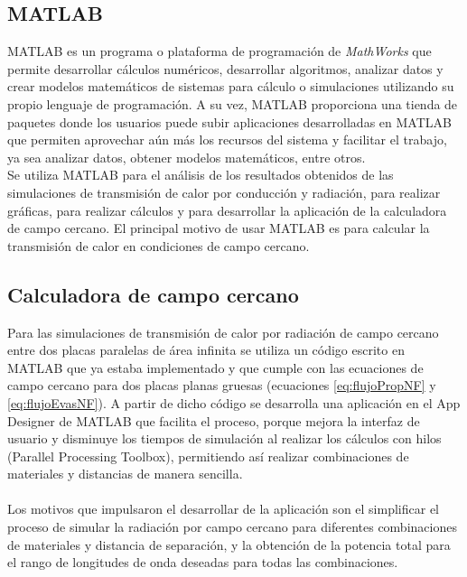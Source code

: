 \subsection{MATLAB}
MATLAB es un programa o plataforma de programación de \textit{MathWorks} que permite desarrollar cálculos numéricos, desarrollar algoritmos, analizar datos y crear modelos matemáticos de sistemas para cálculo o simulaciones utilizando su propio lenguaje de programación. A su vez, MATLAB proporciona una tienda de paquetes donde los usuarios puede subir aplicaciones desarrolladas en MATLAB que permiten aprovechar aún más los recursos del sistema y facilitar el trabajo, ya sea analizar datos, obtener modelos matemáticos, entre otros.\\
Se utiliza MATLAB para el análisis de los resultados obtenidos de las simulaciones de transmisión de calor por conducción y radiación, para realizar gráficas, para realizar cálculos y para desarrollar la aplicación de la calculadora de campo cercano. El principal motivo de usar MATLAB es para calcular la transmisión de calor en condiciones de campo cercano.

\subsection{Calculadora de campo cercano} \label{sec:calc_campo_cercano}
Para las simulaciones de transmisión de calor por radiación de campo cercano entre dos placas paralelas de área infinita se utiliza un código escrito en MATLAB que ya estaba implementado y que cumple con las ecuaciones de campo cercano para dos placas planas gruesas (ecuaciones \eqref{eq:flujoPropNF} y \eqref{eq:flujoEvasNF}). A partir de dicho código se desarrolla una aplicación en el App Designer de MATLAB que facilita el proceso, porque mejora la interfaz de usuario y disminuye los tiempos de simulación al realizar los cálculos con hilos (Parallel Processing Toolbox), permitiendo así realizar combinaciones de materiales y distancias de manera sencilla.\\\\
Los motivos que impulsaron el desarrollar de la aplicación son el simplificar el proceso de simular la radiación por campo cercano para diferentes combinaciones de materiales y distancia de separación, y la obtención de la potencia total para el rango de longitudes de onda deseadas para todas las combinaciones.\\

